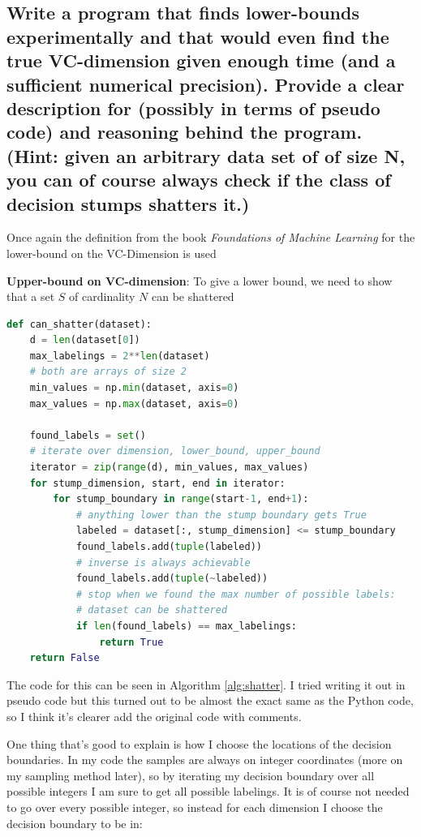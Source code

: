 \documentclass[11pt,a4paper]{article}
\begin{document}
\subsection{Write a program that finds lower-bounds experimentally and that would even find the true VC-dimension given enough time (and a sufficient numerical precision). Provide a clear description for (possibly in terms of pseudo code) and reasoning behind the program. (Hint: given an arbitrary data set of of size N, you can of course always check if the class of decision stumps shatters it.)}
\label{sec:2f}

Once again the definition from the book \textit{Foundations of Machine Learning} \cite{foundations_of_machine_learning} for the lower-bound on the VC-Dimension is used

\textbf{Upper-bound on VC-dimension}: To give a lower bound, we need to show that a set $S$ of cardinality $N$ can be shattered

\begin{lstlisting}[language=Python, caption=Can Shatter Method, label={alg:shatter}]
def can_shatter(dataset):
    d = len(dataset[0])
    max_labelings = 2**len(dataset)
    # both are arrays of size 2
    min_values = np.min(dataset, axis=0)
    max_values = np.max(dataset, axis=0)

    found_labels = set()
    # iterate over dimension, lower_bound, upper_bound
    iterator = zip(range(d), min_values, max_values)
    for stump_dimension, start, end in iterator:
        for stump_boundary in range(start-1, end+1):
            # anything lower than the stump boundary gets True
            labeled = dataset[:, stump_dimension] <= stump_boundary
            found_labels.add(tuple(labeled))
            # inverse is always achievable
            found_labels.add(tuple(~labeled))
            # stop when we found the max number of possible labels:
            # dataset can be shattered
            if len(found_labels) == max_labelings:
                return True
    return False
\end{lstlisting}

The code for this can be seen in Algorithm \ref{alg:shatter}. I tried writing it out in pseudo code but this turned out to be almost the exact same as the Python code, so I think it's clearer add the original code with comments.

One thing that's good to explain is how I choose the locations of the decision boundaries. In my code the samples are always on integer coordinates (more on my sampling method later), so by iterating my decision boundary over all possible integers I am sure to get all possible labelings. It is of course not needed to go over every possible integer, so instead for each dimension I choose the decision boundary to be in:
\end{document}
